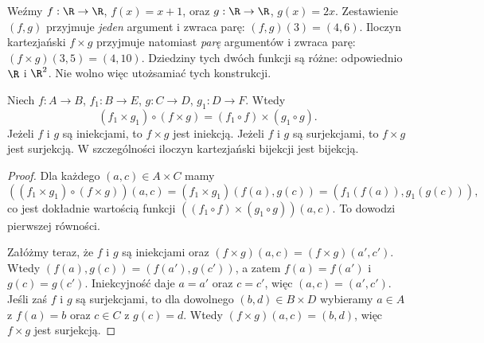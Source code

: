 \begin{przyklad}
Weźmy $f:\R\to\R$, $f(x)=x+1$, oraz $g:\R\to\R$, $g(x)=2x$.
Zestawienie $(f,g)$ przyjmuje \emph{jeden} argument i zwraca
parę: $(f,g)(3)=(4,6)$. Iloczyn kartezjański $f\times g$
przyjmuje natomiast \emph{parę} argumentów i zwraca parę:
$(f\times g)(3,5)=(4,10)$.
Dziedziny tych dwóch funkcji są różne: odpowiednio $\R$ i $\R^2$.
Nie wolno więc utożsamiać tych konstrukcji.
\end{przyklad}

\begin{twierdzenie}\label{thm:product-functions}
Niech $f:A\to B$, $f_1:B\to E$, $g:C\to D$, $g_1:D\to F$.
Wtedy
\[
 (f_1\times g_1)\circ(f\times g)=(f_1\circ f)\times(g_1\circ g).
\]
Jeżeli $f$ i $g$ są iniekcjami, to $f\times g$ jest iniekcją.
Jeżeli $f$ i $g$ są surjekcjami, to $f\times g$ jest surjekcją.
W szczególności iloczyn kartezjański bijekcji jest bijekcją.
\end{twierdzenie}
\begin{proof}
Dla każdego $(a,c)\in A\times C$ mamy
\[
((f_1\times g_1)\circ(f\times g))(a,c)
=(f_1\times g_1)(f(a),g(c))=(f_1(f(a)),g_1(g(c))),
\]
co jest dokładnie wartością funkcji $((f_1\circ f)\times(g_1\circ g))(a,c)$.
To dowodzi pierwszej równości.

Załóżmy teraz, że $f$ i $g$ są iniekcjami oraz
$(f\times g)(a,c)=(f\times g)(a',c')$.
Wtedy $(f(a),g(c))=(f(a'),g(c'))$, a zatem $f(a)=f(a')$ i $g(c)=g(c')$.
Iniekcyjność daje $a=a'$ oraz $c=c'$, więc $(a,c)=(a',c')$.
Jeśli zaś $f$ i $g$ są surjekcjami, to dla dowolnego $(b,d)\in B\times D$
wybieramy $a\in A$ z $f(a)=b$ oraz $c\in C$ z $g(c)=d$.
Wtedy $(f\times g)(a,c)=(b,d)$, więc $f\times g$ jest surjekcją.
\end{proof}


